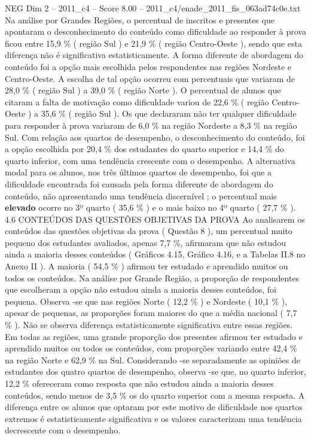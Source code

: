 \begin{textsample}{NEG Dim 2 – 2011\_c4 – Score 8.00 – 2011\_c4/enade\_2011\_fis\_063ad74c0e.txt}
Na análise por Grandes Regiões, o percentual de inscritos e presentes que apontaram o desconhecimento do conteúdo como dificuldade ao responder à prova ficou entre 15,9 \% ( região Sul ) e 21,9 \% ( região Centro-Oeste ), sendo que esta diferença não é significativa estatisticamente.
A forma diferente de abordagem do conteúdo foi a opção mais escolhida pelos respondentes nas regiões Nordeste e Centro-Oeste.
A escolha de tal opção ocorreu com percentuais que variaram de 28,0 \% ( região Sul ) a 39,0 \% ( região Norte ).
O percentual de alunos que citaram a falta de motivação como dificuldade variou de 22,6 \% ( região Centro-Oeste ) a 35,6 \% ( região Sul ).
Os que declararam não ter qualquer dificuldade para responder à prova variaram de 6,0 \% na região Nordeste a 8,3 \% na região Sul.
Com relação aos quartos de desempenho, o desconhecimento do conteúdo, foi a opção escolhida por 20,4 \% dos estudantes do quarto superior e 14,4 \% do quarto inferior, com uma tendência crescente com o desempenho.
A alternativa modal para os alunos, nos três últimos quartos de desempenho, foi que a dificuldade encontrada foi causada pela forma diferente de abordagem do conteúdo, não apresentando uma tendência discernível ; o percentual mais \textbf{elevado} ocorre no 3º quarto ( 35,6 \% ) e o mais baixo no 4º quarto ( 27,7 \% ). 4.6 CONTEÚDOS DAS QUESTÕES OBJETIVAS DA PROVA Ao analisarem os conteúdos das questões objetivas da prova ( Questão 8 ), um percentual muito pequeno dos estudantes avaliados, apenas 7,7 \%, afirmaram que não estudou ainda a maioria desses conteúdos ( Gráficos 4.15, Gráfico 4.16, e a Tabelas II.8 no Anexo II ).
A maioria ( 54,5 \% ) afirmou ter estudado e aprendido muitos ou todos os conteúdos.
Na análise por Grande Região, a proporção de respondentes que escolheram a opção não estudou ainda a maioria desses conteúdos, foi pequena.
Observa -se que nas regiões Norte ( 12,2 \% ) e Nordeste ( 10,1 \% ), apesar de pequenas, as proporções foram maiores do que a média nacional ( 7,7 \% ).
Não se observa diferença estatisticamente significativa entre essas regiões.
Em todas as regiões, uma grande proporção dos presentes afirmou ter estudado e aprendido muitos ou todos os conteúdos, com proporções variando entre 42,4 \% na região Norte e 62,9 \% na Sul.
Considerando -se separadamente as opiniões de estudantes dos quatro quartos de desempenho, observa -se que, no quarto inferior, 12,2 \% ofereceram como resposta que não estudou ainda a maioria desses conteúdos, sendo menos de 3,5 \% os do quarto superior com a mesma resposta.
A diferença entre os alunos que optaram por este motivo de dificuldade nos quartos extremos é estatisticamente significativa e os valores caracterizam uma tendência decrescente com o desempenho.

\end{textsample}

